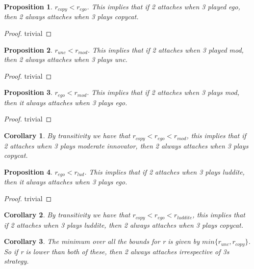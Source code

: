 \documentclass{article}
\newtheorem{corollary}{Corollary}
\newtheorem{proposition}{Proposition}
\begin{document}
\begin{proposition}
$r_{copy}<r_{ego}$. This implies that if 2 attaches when 3 played ego, then 2 always attaches when 3 plays copycat. 
\end{proposition}

\begin{proof}
trivial
\end{proof}



\begin{proposition}
$r_{unc}<r_{mod}$. This implies that if 2 attaches when 3 played mod, then 2 always attaches when 3 plays unc.  
\end{proposition}


\begin{proof}
trivial
\end{proof}

\begin{proposition}
$r_{ego}<r_{mod}$. This implies that if 2 attaches when 3 plays mod, then it always attaches when 3 plays ego.   
\end{proposition}

\begin{proof}
trivial
\end{proof}

\begin{corollary}
By transitivity we have that $r_{copy}<r_{ego}<r_{mod}$, this implies that if 2 attaches when 3 plays moderate innovator, then 2 always attaches when 3 plays copycat. 
\end{corollary}


\begin{proposition}
$r_{ego}<r_{lud}$. This implies that if 2 attaches when 3 plays luddite, then it always attaches when 3 plays ego.   
\end{proposition}

\begin{proof}
trivial
\end{proof}

\begin{corollary}
By transitivity we have that $r_{copy}<r_{ego}<r_{luddite}$, this implies that if 2 attaches when 3 plays luddite, then 2 always attaches when 3 plays copycat.
\end{corollary}

\begin{corollary}\label{minr}
The minimum over all the bounds for r is given by $min \{ r_{unc},r_{copy}  \}$. So if r is lower than both of these, then 2 always attaches irrespective of 3s strategy.
\end{corollary}
\end{document}
